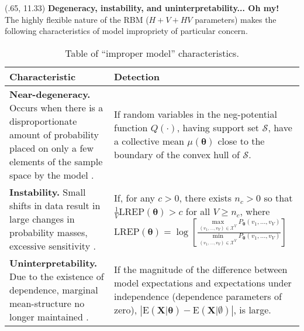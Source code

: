 \documentclass[extrafontsizes, 30pt]{memoir}
\begin{document}
\begin{textblock}{14}(.65, 11.33)
{\large \bfseries Degeneracy, instability, and uninterpretability... Oh my!}\\[-1cm]

The highly flexible nature of the RBM ($H + V + HV$ parameters) makes the following characteristics of model impropriety of particular concern. \\[-.5cm]

\begin{table}
\centering
\begin{tabular}{| p{.48\linewidth} | p{.5\linewidth} |}
\hline
Characteristic & Detection \\
\hline
\hline
{\bfseries Near-degeneracy.} Occurs when there is a disproportionate amount of probability placed on only a few elements of the sample space by the model \cite{handcock2003assessing}. & If random variables in the neg-potential function $Q(\cdot)$, having support set $\mathcal{S}$, have a collective mean $\mu(\boldsymbol \theta)$ close to the boundary of the convex hull of $\mathcal{S}$. \\
\hline
{\bfseries Instability.} Small shifts in data result in large changes in probability masses, excessive sensitivity \cite{schweinberger2011instability}. & 
If, for any $c > 0$, there exists $n_c > 0$ so that $\frac{1}{V}\text{LREP}(\boldsymbol \theta) > c$ for all $V \ge n_c$, where $\text{LREP}(\boldsymbol \theta) = \log \left[\frac{\max\limits_{(v_1, \dots, v_V) \in \mathcal{X}^V}P_{\boldsymbol \theta}(v_1, \dots, v_V)}{\min\limits_{(v_1, \dots, v_V) \in \mathcal{X}^V}P_{\boldsymbol \theta}(v_1, \dots, v_V)}\right]$ \\
\hline
{\bfseries Uninterpretability.} Due to the existence of dependence, marginal mean-structure no longer maintained \cite{kaiser2007statistical}. & If the magnitude of the difference between model expectations and expectations under independence (dependence parameters of zero), $\left|\text{E}(\boldsymbol X | \boldsymbol \theta) - \text{E}(\boldsymbol X | \emptyset ) \right|$, is large.\\
\hline
\end{tabular}
\label{tab:degen}
\caption{Table of ``improper model'' characteristics.}
\end{table}
\end{textblock}
\end{document}
